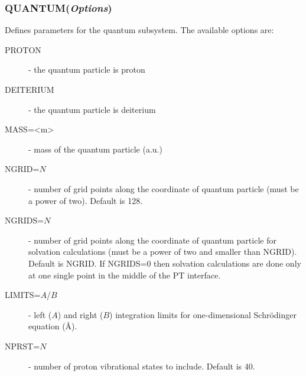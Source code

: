 \documentclass[oneside,11pt,openany]{book}
\newcommand{\tw}{\ttfamily}
\begin{document}
\subsubsection*{QUANTUM({\it Options})}
%
Defines parameters for the quantum subsystem. The available options are:
\begin{description}
\item[{\tw PROTON}] - the quantum particle is proton

\item[{\tw DEITERIUM}] - the quantum particle is deiterium

\item[{\tw MASS=<m>}] - mass of the quantum particle (a.u.)

\item[{\tw NGRID=$N$}] - number of grid points along the
coordinate of quantum particle (must be a power of two). Default is 128.

\item[{\tw NGRIDS=$N$}] - number of grid points along the
coordinate of quantum particle for solvation calculations
(must be a power of two and smaller than NGRID). Default is NGRID.
If {\tw NGRIDS=0} then solvation calculations are done only at one
single point in the middle of the PT interface.

\item[{\tw LIMITS=$A$/$B$}] - left ($A$) and right ($B$) integration
limits for one-dimensional Schr\"odinger equation (\AA).

\item[{\tw NPRST=$N$}] - number of proton vibrational states to include.
Default is 40.

\end{description}
\end{document}
